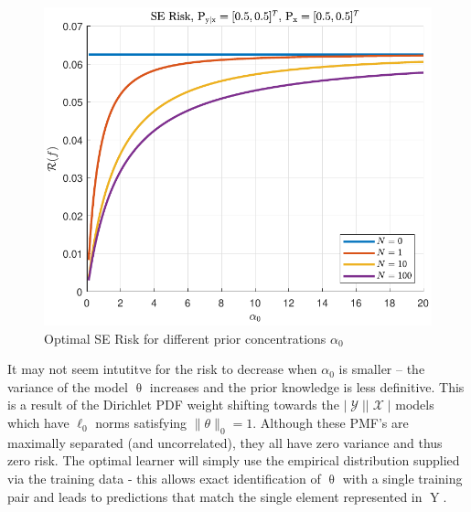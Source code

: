 \documentclass[12pt]{report}
\DeclareMathOperator{\Yrm}{\mathrm{Y}}
\DeclareMathOperator{\Xcal}{\mathcal{X}}
\DeclareMathOperator{\Ycal}{\mathcal{Y}}
\begin{document}
\begin{figure}
\centering
\includegraphics[width=0.8\linewidth]{Risk_SE_Dir_IO_a0_leg_N.pdf}
\caption{Optimal SE Risk for different prior concentrations $\alpha_0$}
\label{fig:Risk_SE_Dir_IO_a0_leg_N}
\end{figure}

It may not seem intutitve for the risk to decrease when $\alpha_0$ is smaller -- the variance of the model $\uptheta$ increases and the prior knowledge is less definitive. This is a result of the Dirichlet PDF weight shifting towards the $|\Ycal||\Xcal|$ models which have $\ell_0$ norms satisfying $\| \theta \|_0 = 1$. Although these PMF's are maximally separated (and uncorrelated), they all have zero variance and thus zero risk. The optimal learner will simply use the empirical distribution supplied via the training data - this allows exact identification of $\uptheta$ with a single training pair and leads to predictions that match the single element represented in $\Yrm$.
\end{document}
